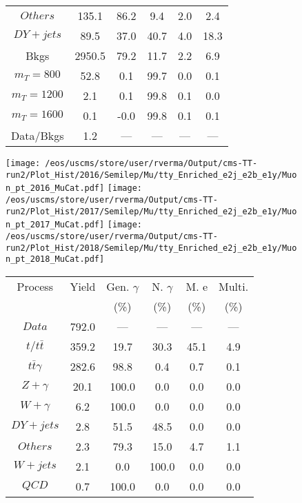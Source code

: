 \begin{figure}
\begin{minipage}[c]{0.32\textwidth}
{\begin{tabular}{cccccc}
$ Others $ &  135.1 &  86.2 &  9.4 &  2.0 &  2.4\\
$ DY+jets $ &  89.5 &  37.0 &  40.7 &  4.0 &  18.3\\
Bkgs &  2950.5 &  79.2 &  11.7 &  2.2 &  6.9\\
$ m_{T} = 800 $ &  52.8 &  0.1 &  99.7 &  0.0 &  0.1\\
$ m_{T} = 1200 $ &  2.1 &  0.1 &  99.8 &  0.1 &  0.0\\
$ m_{T} = 1600 $ &  0.1 &  -0.0 &  99.8 &  0.1 &  0.1\\
Data/Bkgs &  1.2 &  --- &  --- &  --- &  ---\\
\hline
\end{tabular}
}
\end{minipage}
\end{figure}

\begin{figure}
\centering
\texttt{[image: /eos/uscms/store/user/rverma/Output/cms-TT-run2/Plot\_Hist/2016/Semilep/Mu/tty\_Enriched\_e2j\_e2b\_e1y/Muon\_pt\_2016\_MuCat.pdf]}
\texttt{[image: /eos/uscms/store/user/rverma/Output/cms-TT-run2/Plot\_Hist/2017/Semilep/Mu/tty\_Enriched\_e2j\_e2b\_e1y/Muon\_pt\_2017\_MuCat.pdf]}
\texttt{[image: /eos/uscms/store/user/rverma/Output/cms-TT-run2/Plot\_Hist/2018/Semilep/Mu/tty\_Enriched\_e2j\_e2b\_e1y/Muon\_pt\_2018\_MuCat.pdf]}
\begin{minipage}[c]{0.32\textwidth}
\centering
\tiny{
\begin{tabular}{cccccc}
\hline
Process & Yield & Gen. $\gamma$ & N. $\gamma$ & M. e & Multi. \\
 &  & (\%) & (\%) & (\%) & (\%)  \\
\hline
                                                                      $ Data $ &  792.0 &  --- &  --- &  --- &  ---\\
$ t/t\bar{t} $ &  359.2 &  19.7 &  30.3 &  45.1 &  4.9\\
$ t\bar{t}\gamma $ &  282.6 &  98.8 &  0.4 &  0.7 &  0.1\\
$ Z+\gamma $ &  20.1 &  100.0 &  0.0 &  0.0 &  0.0\\
$ W+\gamma $ &  6.2 &  100.0 &  0.0 &  0.0 &  0.0\\
$ DY+jets $ &  2.8 &  51.5 &  48.5 &  0.0 &  0.0\\
$ Others $ &  2.3 &  79.3 &  15.0 &  4.7 &  1.1\\
$ W+jets $ &  2.1 &  0.0 &  100.0 &  0.0 &  0.0\\
$ QCD $ &  0.7 &  100.0 &  0.0 &  0.0 &  0.0\\

\end{tabular}}
\end{minipage}
\end{figure}
